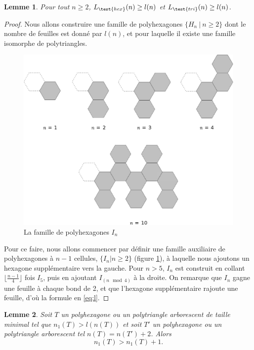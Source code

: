 \documentclass{article}
\newtheorem{lem}{Lemme}[section]
\theoremstyle{definition}
\newcommand{\Lhex}{L_{\test{hex}}}
\newcommand{\Ltri}{L_{\test{tri}}}
\begin{document}
\begin{lem}
   Pour tout $n \geq 2$, $\Lhex(n) \geq l(n)$ et $\Ltri(n) \geq l(n)$.
\end{lem}
\begin{proof}
   Nous allons construire une famille de polyhexagones $\{ H_n\ |\ n \geq 2\}$ dont le nombre de feuilles est donné par $l(n)$, et pour laquelle il existe une famille isomorphe de polytriangles.
   
   \begin{figure}[h!]
   \caption{La famille de polyhexagones $I_n$}
   \label{fig:In}
   \includegraphics[width=\textwidth]{In.eps}
   \end{figure}

   Pour ce faire, nous allons commencer par définir une famille auxiliaire de polyhexagones à $n - 1$ cellules, $\{I_n | n \geq 2\}$ (figure \ref{fig:In}), à laquelle nous ajoutons un hexagone supplémentaire vers la gauche. Pour $n>5$, $I_n$ est construit en collant $\lfloor \frac{n-1}{4} \rfloor$ fois $I_5$, puis en ajoutant $I_{(n \mod 4)}$ à la droite. On remarque que $I_n$ gagne une feuille à chaque bond de 2, et que l'hexagone supplémentaire rajoute une feuille, d'où la formule en \eqref{eq:l}. 
\end{proof}

\begin{lem}
   \label{lem:hyp}
   Soit $T$ un polyhexagone ou un polytriangle arborescent de taille minimal tel que $n_1(T) > l(n(T))$ et soit $T'$ un polyhexagone ou un polytriangle arborescent tel $n(T) = n(T') + 2$. Alors
   \[
      n_1(T) > n_1(T) + 1.
   \]
\end{lem}
\end{document}
